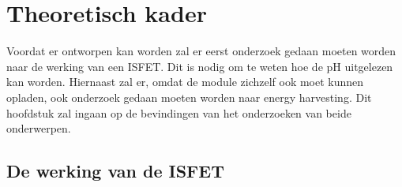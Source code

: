 \section{Theoretisch kader}
Voordat er ontworpen kan worden zal er eerst onderzoek gedaan moeten worden naar de werking van een ISFET. Dit is nodig om te weten hoe de pH uitgelezen kan worden.
Hiernaast zal er, omdat de module zichzelf ook moet kunnen opladen, ook onderzoek gedaan moeten worden naar energy harvesting.
Dit hoofdstuk zal ingaan op de bevindingen van het onderzoeken van beide onderwerpen.

\subsection{De werking van de ISFET}\label{sec:werkingISFET}





